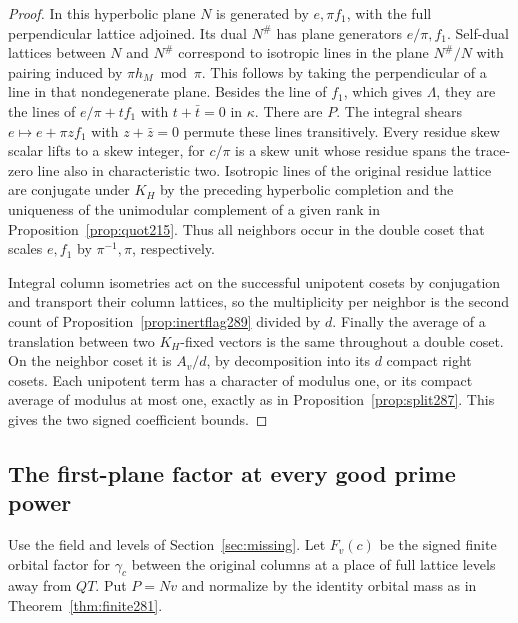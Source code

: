\documentclass[a4paper,11pt]{article}
\theoremstyle{definition}
\theoremstyle{remark}
\numberwithin{equation}{section}
\begin{document}
\begin{proof}
In this hyperbolic plane \(N\) is generated by \(e,\pi f_1\),
with the full perpendicular lattice adjoined. Its dual
\(N^\#\) has plane generators \(e/\pi,f_1\). Self-dual
lattices between \(N\) and \(N^\#\) correspond to isotropic
lines in the plane \(N^\#/N\) with pairing induced by
\(\pi h_M\bmod\pi\). This follows by taking the perpendicular
of a line in that nondegenerate plane. Besides the line
of \(f_1\), which gives \(\Lambda\), they are the lines of
\(e/\pi+t f_1\) with \(t+\bar t=0\) in \(\kappa\).
There are \(P\). The integral shears
\(e\mapsto e+\pi z f_1\) with \(z+\bar z=0\) permute these
lines transitively. Every residue skew scalar lifts to a
skew integer, for \(c/\pi\) is a skew unit whose residue
spans the trace-zero line also in characteristic two.
Isotropic lines of the original residue lattice are conjugate
under \(K_H\) by the preceding hyperbolic completion and the
uniqueness of the unimodular complement of a given rank
in Proposition~\ref{prop:quot215}. Thus all neighbors occur
in the double coset that scales \(e,f_1\) by
\(\pi^{-1},\pi\), respectively.

Integral column isometries act on the successful unipotent
cosets by conjugation and transport their column lattices,
so the multiplicity per neighbor is the second count of
Proposition~\ref{prop:inertflag289} divided by \(d\).
Finally the average of a translation between two
\(K_H\)-fixed vectors is the same throughout a double coset.
On the neighbor coset it is \(A_v/d\), by decomposition
into its \(d\) compact right cosets. Each unipotent term
has a character of modulus one, or its compact average of
modulus at most one, exactly as in
Proposition~\ref{prop:split287}. This gives the two signed
coefficient bounds.
\end{proof}

\subsection{The first-plane factor at every good prime power}\label{nav:II-62}
Use the field and levels of Section~\ref{sec:missing}. Let \(F_v(c)\)
be the signed finite orbital factor for \(\gamma_c\) between
the original columns at a place of full lattice levels
away from \(QT\). Put \(P=Nv\) and normalize by the
identity orbital mass as in Theorem~\ref{thm:finite281}.
\end{document}
